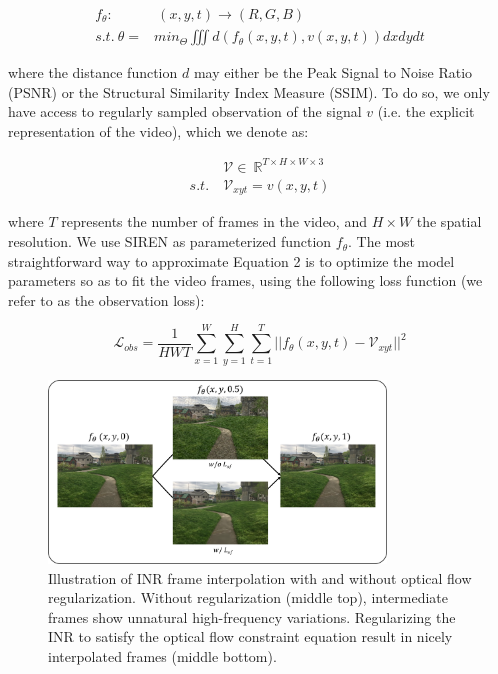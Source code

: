 \documentclass{article}
\begin{document}
\begin{equation}
\begin{aligned}
f_{\theta}:& \:(x, y, t) \rightarrow (R, G, B) \\
s.t. \: \theta =& min_{\Theta} \iiint d(f_{\theta}(x,y,t), v(x,y,t)) dx dy dt
\end{aligned}
\end{equation}

where the distance function $d$ may either be the Peak Signal to Noise Ratio (PSNR) or the Structural Similarity Index Measure (SSIM).
To do so, we only have access to regularly sampled observation of the signal $v$
(i.e. the explicit representation of the video), which we denote as:

\begin{equation}
\begin{aligned}
&\mathcal{V} \in  \: \mathbb{R}^{T \times H \times W \times 3} \\
s.t. \: &\mathcal{V}_{xyt} =   v(x, y, t) %
\end{aligned}
\end{equation}

where $T$ represents the number of frames in the video, and $H \times W$ the spatial resolution.
We use SIREN as parameterized function $f_{\theta}$.
The most straightforward way to approximate Equation 2 is to optimize the model parameters so as to fit the video frames,
using the following loss function (we refer to as the observation loss):

\begin{equation}
\mathcal{L}_{obs} = \frac{1}{HWT} \sum_{x=1}^W\sum_{y=1}^H\sum_{t=1}^T || f_{\theta}(x,y,t) - \mathcal{V}_{xyt} ||^2
\end{equation}

\begin{figure}[t]
\centering
\includegraphics[width=0.8\textwidth]{"w_wo_OF"}
\caption{Illustration of INR frame interpolation with and without optical flow regularization.
Without regularization (middle top), intermediate frames show unnatural high-frequency variations.
Regularizing the INR to satisfy the optical flow constraint equation result in nicely interpolated frames (middle bottom).
}
\label{fig_w_wo_OF}
\end{figure}
\end{document}
